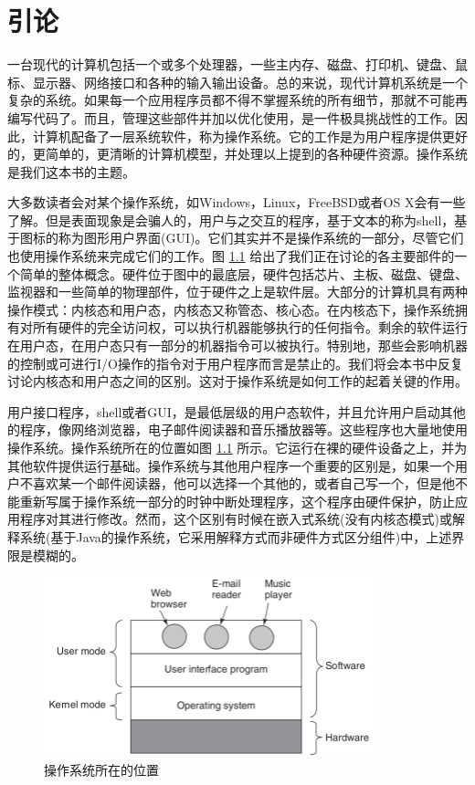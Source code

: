 \chapter{引论}
\thispagestyle{empty}

	一台现代的计算机包括一个或多个处理器，一些主内存、磁盘、打印机、键盘、鼠标、显示器、网络接口和各种的输入输出设备。总的来说，现代计算机系统是一个复杂的系统。如果每一个应用程序员都不得不掌握系统的所有细节，那就不可能再编写代码了。而且，管理这些部件并加以优化使用，是一件极具挑战性的工作。因此，计算机配备了一层系统软件，称为操作系统。它的工作是为用户程序提供更好的，更简单的，更清晰的计算机模型，并处理以上提到的各种硬件资源。操作系统是我们这本书的主题。
	
	大多数读者会对某个操作系统，如Windows，Linux，FreeBSD或者OS X会有一些了解。但是表面现象是会骗人的，用户与之交互的程序，基于文本的称为shell，基于图标的称为图形用户界面(GUI)。它们其实并不是操作系统的一部分，尽管它们也使用操作系统来完成它们的工作。图 \ref{fig:fitin} 给出了我们正在讨论的各主要部件的一个简单的整体概念。硬件位于图中的最底层，硬件包括芯片、主板、磁盘、键盘、监视器和一些简单的物理部件，位于硬件之上是软件层。大部分的计算机具有两种操作模式：内核态和用户态，内核态又称管态、核心态。在内核态下，操作系统拥有对所有硬件的完全访问权，可以执行机器能够执行的任何指令。剩余的软件运行在用户态，在用户态只有一部分的机器指令可以被执行。特别地，那些会影响机器的控制或可进行I/O操作的指令对于用户程序而言是禁止的。我们将会本书中反复讨论内核态和用户态之间的区别。这对于操作系统是如何工作的起着关键的作用。
	
	用户接口程序，shell或者GUI，是最低层级的用户态软件，并且允许用户启动其他的程序，像网络浏览器，电子邮件阅读器和音乐播放器等。这些程序也大量地使用操作系统。操作系统所在的位置如图 \ref{fig:fitin} 所示。它运行在裸的硬件设备之上，并为其他软件提供运行基础。操作系统与其他用户程序一个重要的区别是，如果一个用户不喜欢某一个邮件阅读器，他可以选择一个其他的，或者自己写一个，但是他不能重新写属于操作系统一部分的时钟中断处理程序，这个程序由硬件保护，防止应用程序对其进行修改。然而，这个区别有时候在嵌入式系统(没有内核态模式)或解释系统(基于Java的操作系统，它采用解释方式而非硬件方式区分组件)中，上述界限是模糊的。

	\begin{figure}[ht]\small
		\centering
		\includegraphics[width=0.85\textwidth]{FIG/1-1.pdf}
		\caption{操作系统所在的位置}\label{fig:fitin}
	\end{figure}

